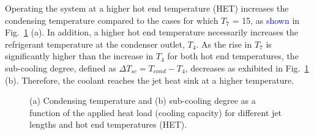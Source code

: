 \documentclass[review,preprint,12pt]{elsarticle}
\begin{document}
Operating the system at a higher hot end temperature (HET) increases the condensing temperature compared to the cases for which $T_{7}$ = 15\textcelsius, as \textcolor{blue}{shown} in Fig.~\ref{fig:Figure_12} (a). In addition, a higher hot end temperature necessarily increases the refrigerant temperature at the condenser outlet, $T_{4}$. As the rise in $T_{7}$ is significantly higher than the increase in $T_{4}$ for both hot end temperatures, the sub-cooling degree, defined as $\Delta T_{sc} = T_{cond} - T_{4}$, decreases as exhibited in Fig.~\ref{fig:Figure_12} (b). Therefore, the coolant reaches the jet heat sink at a higher temperature. 

\begin{figure}[!htp]
\centering
{}
\hfil
{}
\caption{(a) Condensing temperature and (b) sub-cooling degree as a function of the applied heat load (cooling capacity) for different jet lengths and hot end temperatures (HET).}
\label{fig:Figure_12}
\end{figure}
\end{document}
